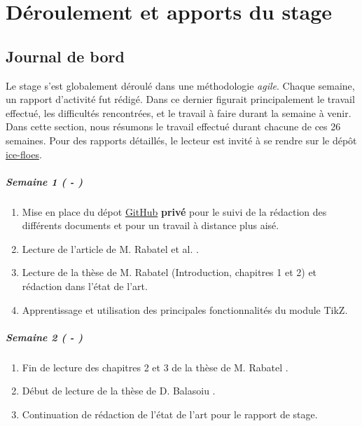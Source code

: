 
\chapter{Déroulement et apports du stage} %

\label{Chapter5} %







\section{Journal de bord}

Le stage s'est globalement déroulé dans une méthodologie \emph{agile}. Chaque semaine, un rapport d'activité fut rédigé. Dans ce dernier figurait principalement le travail effectué, les difficultés rencontrées, et le travail à faire durant la semaine à venir. Dans cette section, nous résumons le travail effectué durant chacune de ces 26 semaines. Pour des rapports détaillés, le lecteur est invité à se rendre sur le dépôt \href{https://github.com/desmond-rn/ice-floes/tree/master/reports/weeks}{ice-floes}.

\paragraph{Semaine 1 ( - )} 
\begin{enumerate}
    \item Mise en place du dépot \href{https://github.com/desmond-rn/ice-floes}{GitHub} \textbf{privé} pour le suivi de la rédaction des différents documents et pour un travail à distance plus aisé. 
    \item Lecture de l'article de M. Rabatel et al. \parencite{rabatel2015dynamics}.
    \item Lecture de la thèse de M. Rabatel \parencite{rabatel2015thesis} (Introduction, chapitres 1 et 2) et rédaction dans l'état de l'art.
    \item Apprentissage et utilisation des principales fonctionnalités du module TikZ.   
\end{enumerate}
  
\paragraph{Semaine 2 ( - )} 
\begin{enumerate}
    \item Fin de lecture des chapitres 2 et 3 de la thèse de M. Rabatel \parencite{rabatel2015thesis}.
    \item Début de lecture de la thèse de D. Balasoiu \parencite{balasoiu2020halthesis}.
    \item Continuation de rédaction de l'état de l'art pour le rapport de stage.
  \end{enumerate}
  

